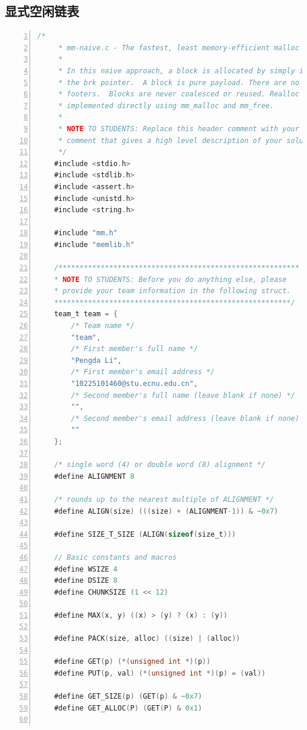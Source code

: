\documentclass{article}
\begin{document}
\subsection{显式空闲链表}
\begin{lstlisting}[xleftmargin = 4em,xrightmargin = 3em, aboveskip = 1em, numbers = left, language = C]
    /*
     * mm-naive.c - The fastest, least memory-efficient malloc package.
     * 
     * In this naive approach, a block is allocated by simply incrementing
     * the brk pointer.  A block is pure payload. There are no headers or
     * footers.  Blocks are never coalesced or reused. Realloc is
     * implemented directly using mm_malloc and mm_free.
     *
     * NOTE TO STUDENTS: Replace this header comment with your own header
     * comment that gives a high level description of your solution.
     */
    #include <stdio.h>
    #include <stdlib.h>
    #include <assert.h>
    #include <unistd.h>
    #include <string.h>

    #include "mm.h"
    #include "memlib.h"

    /*********************************************************
    * NOTE TO STUDENTS: Before you do anything else, please
    * provide your team information in the following struct.
    ********************************************************/
    team_t team = {
        /* Team name */
        "team",
        /* First member's full name */
        "Pengda Li",
        /* First member's email address */
        "10225101460@stu.ecnu.edu.cn",
        /* Second member's full name (leave blank if none) */
        "",
        /* Second member's email address (leave blank if none) */
        ""
    };

    /* single word (4) or double word (8) alignment */
    #define ALIGNMENT 8

    /* rounds up to the nearest multiple of ALIGNMENT */
    #define ALIGN(size) (((size) + (ALIGNMENT-1)) & ~0x7)

    #define SIZE_T_SIZE (ALIGN(sizeof(size_t)))

    // Basic constants and macros
    #define WSIZE 4
    #define DSIZE 8
    #define CHUNKSIZE (1 << 12)

    #define MAX(x, y) ((x) > (y) ? (x) : (y))

    #define PACK(size, alloc) ((size) | (alloc))

    #define GET(p) (*(unsigned int *)(p))
    #define PUT(p, val) (*(unsigned int *)(p) = (val))

    #define GET_SIZE(p) (GET(p) & ~0x7)
    #define GET_ALLOC(P) (GET(P) & 0x1)


\end{lstlisting}
\end{document}
